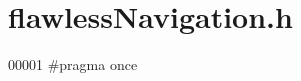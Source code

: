 \hypertarget{flawless_navigation_8h_source}{}\section{flawless\+Navigation.\+h}
\label{flawless_navigation_8h_source}

\begin{DoxyCode}
00001 \textcolor{preprocessor}{#pragma once}
\end{DoxyCode}
